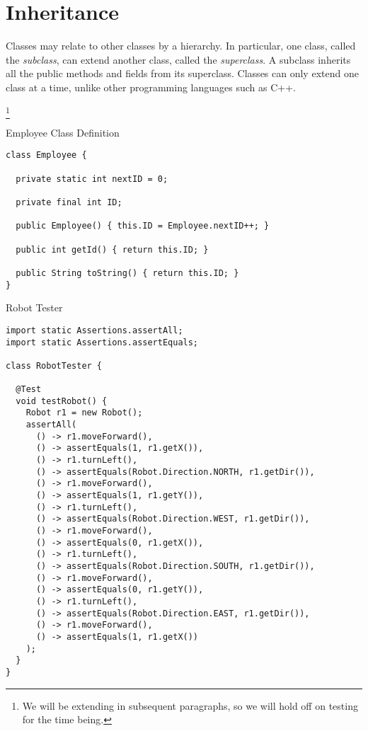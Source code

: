 \section{Inheritance}

Classes may relate to other classes by a hierarchy. In particular, one class, called the \textit{subclass}, can extend another class, called the \textit{superclass}. A subclass inherits all the public methods and fields from its superclass. Classes can only extend one class at a time, unlike other programming languages such as C++. 

\footnote{We will be extending  in subsequent paragraphs, so we will hold off on testing for the time being.}

\begin{cl}{Employee Class Definition}
\begin{lstlisting}[language=MyJava]
class Employee {

  private static int nextID = 0;

  private final int ID;

  public Employee() { this.ID = Employee.nextID++; }

  public int getId() { return this.ID; }

  public String toString() { return this.ID; }
}
\end{lstlisting}
\end{cl}


\begin{cl}{Robot Tester}
\begin{lstlisting}[language=MyJava]
import static Assertions.assertAll;
import static Assertions.assertEquals;

class RobotTester {

  @Test
  void testRobot() {
    Robot r1 = new Robot();
    assertAll(
      () -> r1.moveForward(),
      () -> assertEquals(1, r1.getX()),
      () -> r1.turnLeft(),
      () -> assertEquals(Robot.Direction.NORTH, r1.getDir()),
      () -> r1.moveForward(),
      () -> assertEquals(1, r1.getY()),
      () -> r1.turnLeft(),
      () -> assertEquals(Robot.Direction.WEST, r1.getDir()),
      () -> r1.moveForward(),
      () -> assertEquals(0, r1.getX()),
      () -> r1.turnLeft(),
      () -> assertEquals(Robot.Direction.SOUTH, r1.getDir()),
      () -> r1.moveForward(),
      () -> assertEquals(0, r1.getY()),
      () -> r1.turnLeft(),
      () -> assertEquals(Robot.Direction.EAST, r1.getDir()),
      () -> r1.moveForward(),
      () -> assertEquals(1, r1.getX())
    );
  }
}
\end{lstlisting}
\end{cl}

